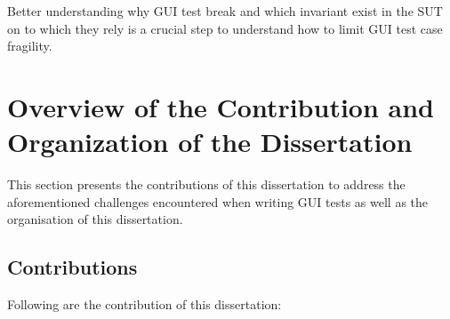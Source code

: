 Better understanding why GUI test break and which invariant exist in the SUT on to which they rely is a crucial step to understand how to limit GUI test case fragility.

\section{Overview of the Contribution and Organization of the Dissertation}

This section presents the contributions of this dissertation to address the aforementioned challenges encountered when writing GUI tests as well as the organisation of this dissertation.

\subsection{Contributions}

Following are the contribution of this dissertation:

